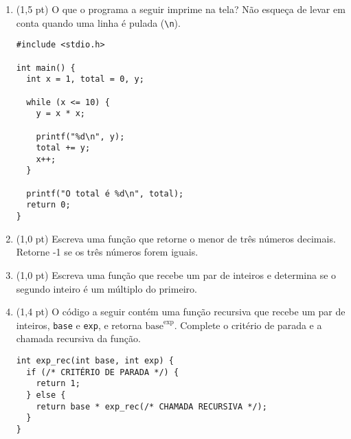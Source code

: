 \documentclass[a4paper,10pt]{article}
\begin{document}
\begin{multicols*}{2}
\begin{enumerate}
  \item (1,5 pt) O que o programa a seguir imprime na tela? Não esqueça de levar em conta quando uma linha é pulada (\texttt{\textbackslash n}).

  \begin{verbatim}
#include <stdio.h>

int main() {
  int x = 1, total = 0, y;

  while (x <= 10) {
    y = x * x;

    printf("%d\n", y);
    total += y;
    x++;
  }

  printf("O total é %d\n", total);
  return 0;
}
  \end{verbatim}

  \vfill\null
  \columnbreak

  \item (1,0 pt) Escreva uma função que retorne o menor de três números decimais. Retorne -1 se os três números forem iguais.

  \item (1,0 pt) Escreva uma função que recebe um par de inteiros e determina se o segundo inteiro é um múltiplo do primeiro.

  \item (1,4 pt) O código a seguir contém uma função recursiva que recebe um par de inteiros, \texttt{base} e \texttt{exp}, e retorna $\text{base}^\text{exp}$. Complete o critério de parada e a chamada recursiva da função.

  \begin{verbatim}
int exp_rec(int base, int exp) {
  if (/* CRITÉRIO DE PARADA */) {
    return 1;
  } else {
    return base * exp_rec(/* CHAMADA RECURSIVA */);
  }
}
  \end{verbatim}
\end{enumerate}
\end{multicols*}

\pagebreak

\maketitle
\end{document}
